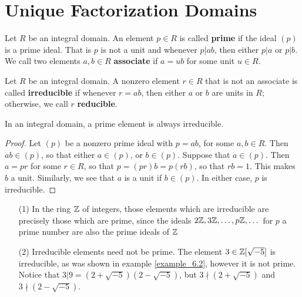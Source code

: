 \section{Unique Factorization Domains}
\label{section_6.3}

\begin{definition}
  Let $R$ be an integral domain. An element $p \in R$ is called \textbf{prime}
  if the ideal $(p)$ is a prime ideal. That is $p$ is not a unit and whenever
  $p|ab$, then either  $p|a$ or $p|b$. We call two elements $a,b \in R$
  \textbf{associate} if $a=ub$ for some unit $u \in R$.
\end{definition}


\begin{definition}
  Let $R$ be an integral domain. A nonzero element  $r \in R$ that is not an
  associate is called \textbf{irreducible} if whenever $r=ab$, then either $a$
  or $b$ are units in $R$; otherwise, we call $r$ \textbf{reducible}.
\end{definition}

\begin{proposition}\label{proposition_6.3.1}
  In an integral domain, a prime element is always irreducible.
\end{proposition}
\begin{proof}
  Let $(p)$ be a nonzero prime ideal with $p=ab$, for some  $a,b \in R$. Then
  $ab \in (p)$, so that either $a \in (p)$, or $b \in (p)$. Suppose that $a
  \in (p)$. Then $a=pr$ for some  $r \in R$, so that  $p=(pr)b=p(rb)$, so
  that $rb=1$. This makes $b$ a unit. Similarly, we see that $a$ is a unit if
  $b \in (p)$. In either case, $p$ is irreducible.
\end{proof}

\begin{example}\label{example_6.6}
  \begin{enumerate}
    \item[(1)] In the ring $\mathbb{Z}$ of integers, those elements which are
      irreducible are precisely those which are prime, since the ideals
      $2\mathbb{Z}, 3\mathbb{Z}, \dots, p\mathbb{Z}, \dots$ for  $p$ a prime number are also the
      prime ideals of $\mathbb{Z}$

    \item[(2)] Irreducible elements need not be prime. The element $3 \in
      \mathbb{Z}[\sqrt{-5}]$ is irreducible, as was shown in example
      \ref{example_6.2},
      however it is not prime. Notice that
      $3|9=(2+\sqrt{-5})(2-\sqrt{-5})$, but $3 \nmid (2+\sqrt{-5})$ and
      $3 \nmid (2-\sqrt{-5})$.
  \end{enumerate}
\end{example}

